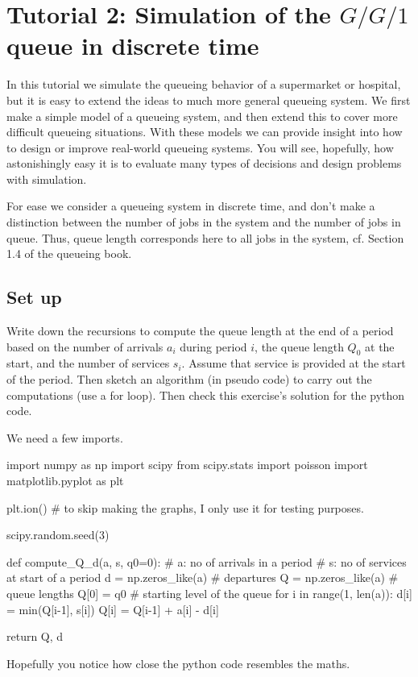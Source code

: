 \section{Tutorial 2: Simulation of the $G/G/1$ queue in discrete time}
\label{sec:single-server-queue}

In this tutorial we simulate the queueing behavior of a supermarket or hospital, but it is easy to extend the ideas to much more general queueing system.
We first make a simple model of a queueing system, and then extend this to cover  more difficult queueing situations.
With these models we can provide insight into how to design or improve real-world queueing systems.
You will see, hopefully, how astonishingly easy it is to evaluate many types of decisions and design problems with simulation.

For ease we  consider a queueing system in discrete time, and don't make a distinction between the number of jobs in the system and the number of jobs in queue. Thus, queue length corresponds here to all jobs in the system, cf. Section 1.4 of the queueing book.

\subsection{Set up}
\label{sec:set-up}


\begin{exercise}
  Write down the recursions to compute the queue length at the end of a period based on the number of arrivals $a_i$ during period $i$, the queue length $Q_0$ at the start, and the number of services $s_i$.
  Assume that service is provided at the start of the period.
  Then sketch an algorithm (in pseudo code) to carry out the computations (use a for loop).
  Then check this exercise's solution for the python code.

\begin{solution}
    We need a few imports.
\begin{pyverbatim}
import numpy as np
import scipy
from scipy.stats import poisson
import matplotlib.pyplot as plt

plt.ion() # to skip making the graphs, I only use it for testing purposes.

scipy.random.seed(3)

def compute_Q_d(a, s, q0=0):
    # a: no of arrivals in a period
    # s: no of services at start of a period
    d = np.zeros_like(a) # departures
    Q = np.zeros_like(a) # queue lengths
    Q[0] = q0 # starting level of the queue
    for i in range(1, len(a)):
        d[i] = min(Q[i-1], s[i])
        Q[i] = Q[i-1] + a[i] - d[i]

    return Q, d

\end{pyverbatim}
Hopefully you notice how close the python code resembles the maths.
  \end{solution}

\end{exercise}


